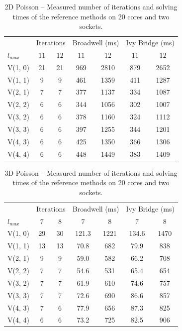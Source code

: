 \begin{table}
	\caption{2D Poisson -- Measured number of iterations and solving times of the reference methods on 20 cores and two sockets.}
	\label{table:poisson-2D-reference-methods}
	\centering
	\begin{tabular}{l c c c c c c}
		\toprule
		& \multicolumn{2}{c}{Iterations} & \multicolumn{2}{c}{Broadwell (ms)} & \multicolumn{2}{c}{Ivy Bridge (ms)} \\
		\cmidrule(r){2-3} \cmidrule(r){4-5} \cmidrule(r){6-7}
		$l_{max}$ & $11$& $12$ & $11$ & $12$ & $11$ & $12$\\
		\midrule
		V(1, 0) & 21 & 21 & 969 & 2810 & 879 & 2652 \\
		\midrule
		V(1, 1) & 9 & 9 & 461 & 1359 & 411 & 1287 \\
		\midrule
		V(2, 1) & 7 & 7 & 377 & 1137 & 334 & 1087\\
		\midrule
		V(2, 2) & 6 & 6 & 344 & 1056 & 302 & 1007 \\
		\midrule
		V(3, 2) & 6 & 6 & 378 & 1160 & 324 & 1112 \\
		\midrule
		V(3, 3) & 6 & 6 & 397 & 1255 & 344 & 1201 \\
		\midrule
		V(4, 3) & 6 & 6 & 425 & 1350 & 366 & 1306 \\
		\midrule
		V(4, 4) & 6 & 6 & 448 & 1449 & 383 & 1409\\
		\bottomrule
	\end{tabular}
\end{table}
\begin{table}
	\caption{3D Poisson -- Measured number of iterations and solving times of the reference methods on 20 cores and two sockets.}
	\label{table:poisson-3D-reference-methods}
	\centering
	\begin{tabular}{l c c c c c c}
		\toprule
		& \multicolumn{2}{c}{Iterations} & \multicolumn{2}{c}{Broadwell (ms)} & \multicolumn{2}{c}{Ivy Bridge (ms)} \\
		\cmidrule(r){2-3} \cmidrule(r){4-5} \cmidrule(r){6-7}
		$l_{max}$ & $7$& $8$ & $7$ & $8$ & $7$ & $8$\\
		\midrule
		V(1, 0) & 29 & 30 & 121.3 &1221 & 134.6 & 1470 \\
		\midrule
		V(1, 1) & 13 & 13 & 70.8 & 682 & 79.9 & 838 \\
		\midrule
		V(2, 1) & 9 & 9 & 59.0 & 582 & 66.2 & 708 \\
		\midrule
		V(2, 2) & 7 & 7 & 54.6 & 531 & 65.4 & 654 \\
		\midrule
		V(3, 2) & 7 & 7 & 61.9 & 610 & 74.6 & 757 \\
		\midrule
		V(3, 3) & 7 & 7 & 72.6 & 690 & 86.6 & 857 \\
		\midrule
		V(4, 3) & 7 & 6 & 77.9 & 656 & 87.3 & 825 \\
		\midrule
		V(4, 4) & 6 & 6 & 73.2 & 725 & 82.5 & 906 \\
		\bottomrule
	\end{tabular}
\end{table}

